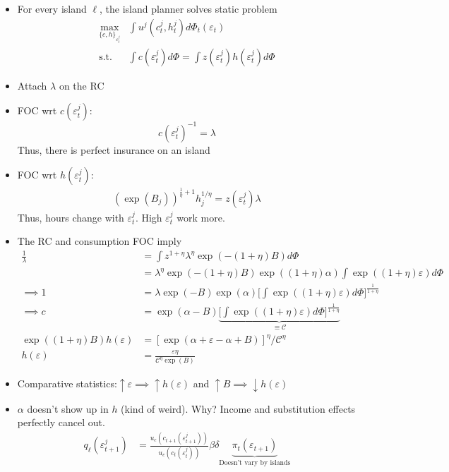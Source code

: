 \documentclass{article}
\begin{document}
\begin{enumerate}
\begin{itemize}
\item For every island $\ell$, the island planner solves static problem
\begin{align*}
\max_{\{c, h\}_{\varepsilon^j_t}} & \int u^j(c_t^j, h_t^j) d \Phi_t (\varepsilon_t)\\
\text{s.t. } & \int c(\varepsilon_t^j) d \Phi = \int z(\varepsilon_t^j) h (\varepsilon_t^j) d \Phi 
\end{align*}
\item Attach $\lambda$ on the RC
\item FOC  wrt $c(\varepsilon_t^j)$:
$$
c(\varepsilon_t^j)^{-1} = \lambda 
$$
Thus, there is perfect insurance on an island
\item FOC wrt $h(\varepsilon_t^j)$:
\begin{align*}
(\exp(B_j))^{\frac{1}{\eta} + 1} h_j^{1/\eta} = z(\varepsilon_t^j) \lambda
\end{align*}
Thus, hours change with $\varepsilon_t^j$. High $\varepsilon_t^j$ work more.
\item The RC and consumption FOC imply
\begin{align*}
\frac{1}{\lambda} 
&= \int z^{1 + \eta} \lambda^\eta \exp(-(1+\eta)B) d \Phi\\
&= \lambda^\eta \exp(-(1+\eta) B) \exp((1+\eta)\alpha) \int \exp((1+\eta)\varepsilon) d \Phi\\
\implies
1 &= \lambda \exp(-B) \exp(\alpha) \Bigg[\int \exp((1 + \eta)\varepsilon)d\Phi \Bigg]^{\frac{1}{1+\eta}}\\
\implies
c &= \exp(\alpha - B) \underbrace{\Bigg[\int \exp((1 + \eta)\varepsilon)d\Phi \Bigg]^{\frac{1}{1+\eta}}}_{\equiv \mathcal{C}}\\
\exp((1+\eta)B)h(\varepsilon) &= [\exp(\alpha + \varepsilon - \alpha + B)]^\eta / \mathcal{C}^\eta\\
h(\varepsilon) &= \frac{\varepsilon \eta}{\mathcal{C}^\eta \exp(B)}
\end{align*}
\item Comparative statistics:$\uparrow \varepsilon \implies \uparrow h(\varepsilon)$ and $\uparrow B \implies \downarrow h(\varepsilon)$
\item $\alpha$ doesn't show up in $h$ (kind of weird). Why? Income and substitution effects perfectly cancel out.
\begin{align*}
q_\ell(\varepsilon_{t+1}^j) 
&= \frac{u_c(c_{t+1}(\varepsilon_{t+1}^j))}{u_c(c_{t}(\varepsilon_{t}^j))} \beta \delta \underbrace{\pi_t(\varepsilon_{t+1})}_{\text{Doesn't vary by islands}}\\

\end{align*}
\end{itemize}
\end{enumerate}
\end{document}
